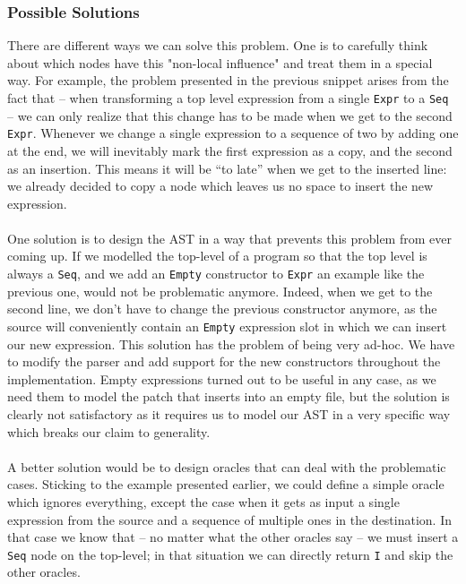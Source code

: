 \documentclass[11pt, titlepage]{article}
\newcommand{\toHaskell}[1]{\texttt{#1}\xspace}
\begin{document}
\subsubsection*{Possible Solutions}
There are different ways we can solve this problem. 
One is to carefully think about which nodes have this "non-local influence" and treat them in a special way. 
For example, the problem presented in the previous snippet arises from the fact that -- when transforming a top level expression from a single \toHaskell{Expr} to a \toHaskell{Seq} -- we can only realize that this change has to be made when we get to the second \toHaskell{Expr}. 
Whenever we change a single expression to a sequence of two by adding one at the end, we will inevitably mark the first expression as a copy, and the second as an insertion. This means it will be ``to late'' when we get to the inserted line: we already decided to copy a node which leaves us no space to insert the new expression.
\\
\\
One solution is to design the AST in a way that prevents this problem from ever coming up. If we modelled the top-level of a program so that the top level is always a \toHaskell{Seq}, and we add an \toHaskell{Empty} constructor to \toHaskell{Expr} an example like the previous one, would not be problematic anymore. 
Indeed, when we get to the second line, we don't have to change the previous constructor anymore, as the source will conveniently contain an \toHaskell{Empty} expression slot in which we can insert our new expression.
This solution has the problem of being very ad-hoc. We have to modify the parser and add support for the new constructors throughout the implementation. Empty expressions turned out to be useful in any case, as we need them to model the patch that inserts into an empty file, but the solution is clearly not satisfactory as it requires us to model our AST in a very specific way which breaks our claim to generality.
\\
\\
A better solution would be to design oracles that can deal with the problematic cases. 
Sticking to the example presented earlier, we could define a simple oracle which ignores everything, except the case when it gets as input a single expression from the source and a sequence of multiple ones in the destination. In that case we know that -- no matter what the other oracles say -- we must insert a \toHaskell{Seq} node on the top-level; in that situation we can directly return \toHaskell{I} and skip the other oracles. 
\end{document}
